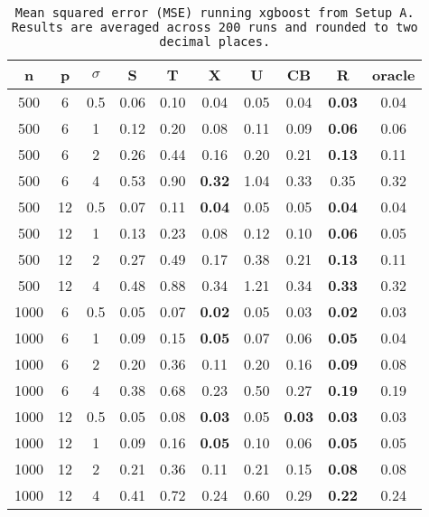 \begin{table}[ht]
\centering
\begin{tabular}{cccccccccc}
  \hline
n & p & $\sigma$ & S & T & X & U & CB & R & oracle \\ 
  \hline
500 & 6 & 0.5 & 0.06 & 0.10 & 0.04 & 0.05 & 0.04 & \bf 0.03 & 0.04 \\ 
  500 & 6 & 1 & 0.12 & 0.20 & 0.08 & 0.11 & 0.09 & \bf 0.06 & 0.06 \\ 
  500 & 6 & 2 & 0.26 & 0.44 & 0.16 & 0.20 & 0.21 & \bf 0.13 & 0.11 \\ 
  500 & 6 & 4 & 0.53 & 0.90 & \bf 0.32 & 1.04 & 0.33 & 0.35 & 0.32 \\ 
  500 & 12 & 0.5 & 0.07 & 0.11 & \bf 0.04 & 0.05 & 0.05 & \bf 0.04 & 0.04 \\ 
  500 & 12 & 1 & 0.13 & 0.23 & 0.08 & 0.12 & 0.10 & \bf 0.06 & 0.05 \\ 
  500 & 12 & 2 & 0.27 & 0.49 & 0.17 & 0.38 & 0.21 & \bf 0.13 & 0.11 \\ 
  500 & 12 & 4 & 0.48 & 0.88 & 0.34 & 1.21 & 0.34 & \bf 0.33 & 0.32 \\ 
  1000 & 6 & 0.5 & 0.05 & 0.07 & \bf 0.02 & 0.05 & 0.03 & \bf 0.02 & 0.03 \\ 
  1000 & 6 & 1 & 0.09 & 0.15 & \bf 0.05 & 0.07 & 0.06 & \bf 0.05 & 0.04 \\ 
  1000 & 6 & 2 & 0.20 & 0.36 & 0.11 & 0.20 & 0.16 & \bf 0.09 & 0.08 \\ 
  1000 & 6 & 4 & 0.38 & 0.68 & 0.23 & 0.50 & 0.27 & \bf 0.19 & 0.19 \\ 
  1000 & 12 & 0.5 & 0.05 & 0.08 & \bf 0.03 & 0.05 & \bf 0.03 & \bf 0.03 & 0.03 \\ 
  1000 & 12 & 1 & 0.09 & 0.16 & \bf 0.05 & 0.10 & 0.06 & \bf 0.05 & 0.05 \\ 
  1000 & 12 & 2 & 0.21 & 0.36 & 0.11 & 0.21 & 0.15 & \bf 0.08 & 0.08 \\ 
  1000 & 12 & 4 & 0.41 & 0.72 & 0.24 & 0.60 & 0.29 & \bf 0.22 & 0.24 \\ 
   \hline
\end{tabular}
\caption{\tt Mean squared error (MSE) running \texttt{xgboost} from Setup A. Results are averaged across 200 runs and rounded to two decimal places.} 
\label{table:setup1}
\end{table}

